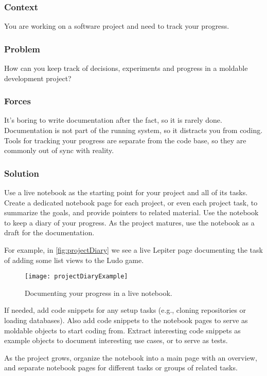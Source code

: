 \documentclass[sigconf]{acmart}
\begin{document}
\subsubsection*{Context}
You are working on a software project and need to track your progress.

\subsubsection*{Problem}
How can you keep track of decisions, experiments and progress in a moldable development project?

\subsubsection*{Forces}
It's boring to write documentation after the fact, so it is rarely done.
Documentation is not part of the running system, so it distracts you from coding.
Tools for tracking your progress are separate from the code base, so they are commonly out of sync with reality.

\subsubsection*{Solution}
Use a live notebook as the starting point for your project and all of its tasks.
Create a dedicated notebook page for each project, or even each project task, to summarize the goals, and provide pointers to related material.
Use the notebook to keep a diary of your progress.
As the project matures, use the notebook as a draft for the documentation.

For example, in \autoref{fig:projectDiary} we see a live Lepiter page \cite{Girb21a} documenting the task of adding some list views to the Ludo game.

\begin{figure}[h]
  \texttt{[image: projectDiaryExample]}
  \caption{Documenting your progress in a live notebook.}
  \label{fig:projectDiary}
\end{figure}

If needed, add code snippets for any setup tasks (e.g., cloning repositories or loading databases).
Also add code snippets to the notebook pages to serve as moldable objects to start coding from.
Extract interesting code snippets as example objects to document interesting use cases, or to serve as tests.

As the project grows, organize the notebook into a main page with an overview, and separate notebook pages for different tasks or groups of related tasks.
\end{document}
